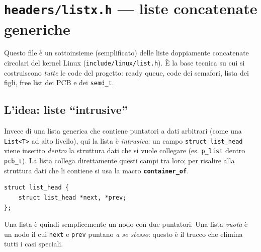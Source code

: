 \documentclass[11pt,a4paper]{article}
\newcommand{\code}[1]{\texttt{#1}}
\newcommand{\func}[1]{\textbf{\texttt{#1}}}
\begin{document}
\section{\code{headers/listx.h} --- liste concatenate generiche}

Questo file è un sottoinsieme (semplificato) delle liste doppiamente
concatenate circolari del kernel Linux (\code{include/linux/list.h}). È la
base tecnica su cui si costruiscono \emph{tutte} le code del progetto: ready
queue, code dei semafori, lista dei figli, free list dei PCB e dei
\code{semd\_t}.

\subsection{L'idea: liste ``intrusive''}
Invece di una lista generica che contiene puntatori a dati arbitrari
(come una \code{List<T>} ad alto livello), qui la lista è \emph{intrusiva}:
un campo \code{struct list\_head} viene inserito \emph{dentro} la struttura
dati che si vuole collegare (es. \code{p\_list} dentro \code{pcb\_t}). La
lista collega direttamente questi campi tra loro; per risalire alla struttura
dati che li contiene si usa la macro \func{container\_of}.

\begin{lstlisting}
struct list_head {
    struct list_head *next, *prev;
};
\end{lstlisting}
Una lista è quindi semplicemente un nodo con due puntatori. Una lista
\emph{vuota} è un nodo il cui \code{next} e \code{prev} puntano \emph{a se
stesso}: questo è il trucco che elimina tutti i casi speciali.
\end{document}
